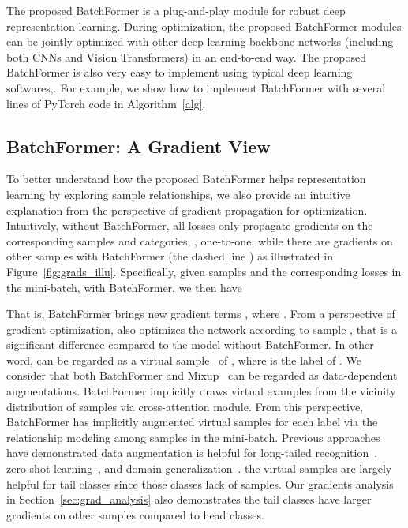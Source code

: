 \documentclass[10pt,twocolumn,letterpaper]{article}
\begin{document}
The proposed BatchFormer is a plug-and-play module for robust deep representation learning. During optimization, the proposed BatchFormer modules can be jointly optimized with other deep learning backbone networks (including both CNNs and Vision Transformers) in an end-to-end way. The proposed BatchFormer is also very easy to implement using typical deep learning softwares,. For example, we show how to implement BatchFormer with several lines of PyTorch code in Algorithm~\ref{alg}.




\subsection{BatchFormer: A Gradient View}












To better understand how the proposed BatchFormer helps representation learning by exploring sample relationships, we also provide an intuitive explanation from the perspective of gradient propagation for optimization. Intuitively, without BatchFormer, all losses only propagate gradients on the corresponding samples and categories, \ie, one-to-one, while there are gradients on other samples with BatchFormer (the dashed line ) as illustrated in Figure~\ref{fig:grads_illu}. Specifically, given samples  and the corresponding losses  in the mini-batch, with BatchFormer, we then have

That is, BatchFormer brings new gradient terms , where . From a perspective of gradient optimization,  also optimizes the network according to sample , that is a significant difference compared to the model without BatchFormer. In other word,  can be regarded as a virtual sample~\cite{zhang2018mixup, he2021distilling} of , where  is the label of . We consider that both BatchFormer and Mixup~\cite{zhang2018mixup} can be regarded as data-dependent augmentations. BatchFormer implicitly draws virtual examples from the vicinity distribution of samples via cross-attention module. From this perspective, BatchFormer has implicitly augmented  virtual samples for each label  via the relationship modeling among samples in the mini-batch. Previous approaches~\cite{balaji2018metareg, zhu2018generative} have demonstrated data augmentation is helpful for long-tailed recognition~\cite{he2021distilling, wang2021rsg}, zero-shot learning~\cite{zhu2018generative}, and domain generalization~\cite{zhou2020learning, zhou2021domain}.
the virtual samples are largely helpful for tail classes since those classes lack of samples. Our gradients analysis in Section~\ref{sec:grad_analysis} also demonstrates the tail classes have larger gradients on other samples compared to head classes.
\end{document}
